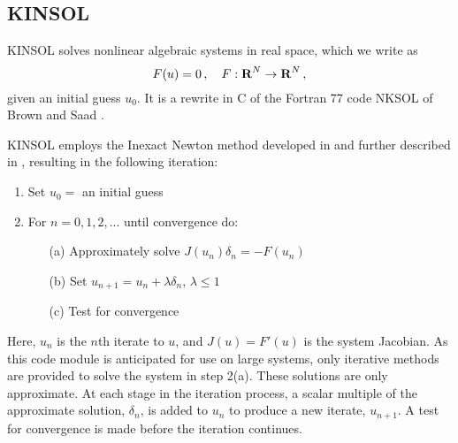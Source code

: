 \subsection{KINSOL}\label{ss:kinsol}

KINSOL solves nonlinear algebraic systems in real space, which we write as
\begin{equation}\label{nonlinear_system}
  F(u) = 0 \, , \quad F:\mbox{\bf R}^N \rightarrow \mbox{\bf R}^N \, ,
\end{equation}
given an initial guess $u_0$.  It is a rewrite in C of the Fortran 77
code NKSOL of Brown and Saad \cite{BrSa:90}.

KINSOL employs the Inexact Newton method developed in
\cite{BrSa:90,Bro:87,DES:82}
and further described in \cite{DeSc:96,Kel:95},
resulting in the following iteration:

\vspace{1ex}
\begin{enumerate}
   \item Set $u_0 = $ an initial guess
   \item For $n = 0, 1, 2,...$ until convergence do:
      \begin{itemize}
          \item[(a)] Approximately solve $J(u_n)\delta_n = - F(u_n)$
          \item[(b)] Set $u_{n+1} = u_n + \lambda \delta_n$,
          $\lambda \leq 1$
          \item[(c)] Test for convergence
      \end{itemize}
\end{enumerate}
Here, $u_n$ is the $n$th iterate to $u$, and $J(u) = F'(u)$ is the
system Jacobian. As this code module is anticipated for use on
large systems, only iterative methods are provided to solve the
system in step 2(a). These solutions are only approximate.  At
each stage in the iteration process, a scalar multiple of the
approximate solution, $\delta_n$, is added to $u_n$ to produce a
new iterate, $u_{n+1}$. A test for convergence is made before the
iteration continues.

